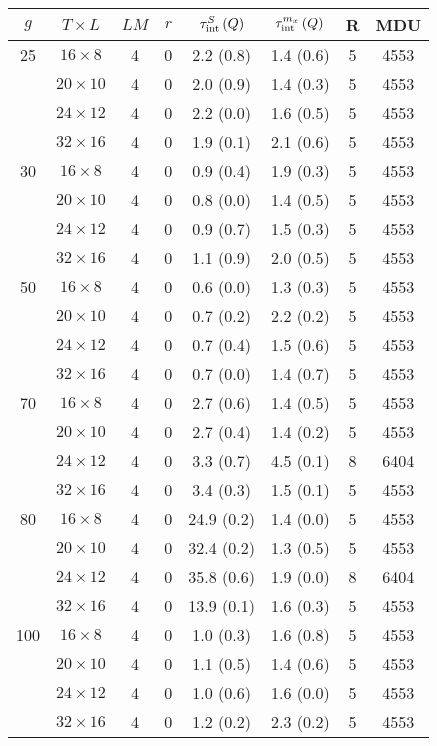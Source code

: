 \begin{longtable}{cccccccc}
\toprule
$g$ & $T\times L$ & $LM$ & $r$ & $\tau_{\rm int}^{S}\,(Q)$ & $\tau_{\rm int}^{m_x}\,(Q)$ & R & MDU \\
\midrule
 25 & $16 \times   8$ &  4 & 0 & 2.2 \; (0.8) & 1.4 \; (0.6) & 5 & 4553 \\
    & $20 \times  10$ &  4 & 0 & 2.0 \; (0.9) & 1.4 \; (0.3) & 5 & 4553 \\
    & $24 \times  12$ &  4 & 0 & 2.2 \; (0.0) & 1.6 \; (0.5) & 5 & 4553 \\
    & $32 \times  16$ &  4 & 0 & 1.9 \; (0.1) & 2.1 \; (0.6) & 5 & 4553 \\
\midrule
 30 & $16 \times   8$ &  4 & 0 & 0.9 \; (0.4) & 1.9 \; (0.3) & 5 & 4553 \\
    & $20 \times  10$ &  4 & 0 & 0.8 \; (0.0) & 1.4 \; (0.5) & 5 & 4553 \\
    & $24 \times  12$ &  4 & 0 & 0.9 \; (0.7) & 1.5 \; (0.3) & 5 & 4553 \\
    & $32 \times  16$ &  4 & 0 & 1.1 \; (0.9) & 2.0 \; (0.5) & 5 & 4553 \\
\midrule
 50 & $16 \times   8$ &  4 & 0 & 0.6 \; (0.0) & 1.3 \; (0.3) & 5 & 4553 \\
    & $20 \times  10$ &  4 & 0 & 0.7 \; (0.2) & 2.2 \; (0.2) & 5 & 4553 \\
    & $24 \times  12$ &  4 & 0 & 0.7 \; (0.4) & 1.5 \; (0.6) & 5 & 4553 \\
    & $32 \times  16$ &  4 & 0 & 0.7 \; (0.0) & 1.4 \; (0.7) & 5 & 4553 \\
\midrule
 70 & $16 \times   8$ &  4 & 0 & 2.7 \; (0.6) & 1.4 \; (0.5) & 5 & 4553 \\
    & $20 \times  10$ &  4 & 0 & 2.7 \; (0.4) & 1.4 \; (0.2) & 5 & 4553 \\
    & $24 \times  12$ &  4 & 0 & 3.3 \; (0.7) & 4.5 \; (0.1) & 8 & 6404 \\
    & $32 \times  16$ &  4 & 0 & 3.4 \; (0.3) & 1.5 \; (0.1) & 5 & 4553 \\
\midrule
 80 & $16 \times   8$ &  4 & 0 & 24.9 \; (0.2) & 1.4 \; (0.0) & 5 & 4553 \\
    & $20 \times  10$ &  4 & 0 & 32.4 \; (0.2) & 1.3 \; (0.5) & 5 & 4553 \\
    & $24 \times  12$ &  4 & 0 & 35.8 \; (0.6) & 1.9 \; (0.0) & 8 & 6404 \\
    & $32 \times  16$ &  4 & 0 & 13.9 \; (0.1) & 1.6 \; (0.3) & 5 & 4553 \\
\midrule
100 & $16 \times   8$ &  4 & 0 & 1.0 \; (0.3) & 1.6 \; (0.8) & 5 & 4553 \\
    & $20 \times  10$ &  4 & 0 & 1.1 \; (0.5) & 1.4 \; (0.6) & 5 & 4553 \\
    & $24 \times  12$ &  4 & 0 & 1.0 \; (0.6) & 1.6 \; (0.0) & 5 & 4553 \\
    & $32 \times  16$ &  4 & 0 & 1.2 \; (0.2) & 2.3 \; (0.2) & 5 & 4553 \\
\bottomrule
\end{longtable}
